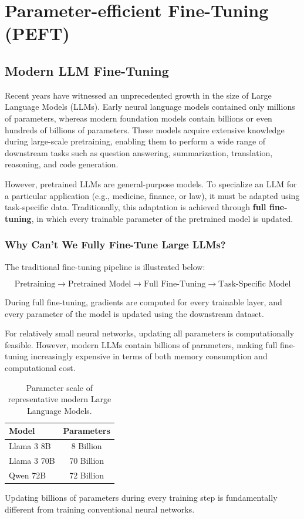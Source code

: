 \chapter{Parameter-efficient Fine-Tuning (PEFT)}





\section{Modern LLM Fine-Tuning}

Recent years have witnessed an unprecedented growth in the size of Large Language Models (LLMs). Early neural language models contained only millions of parameters, whereas modern foundation models contain billions or even hundreds of billions of parameters. These models acquire extensive knowledge during large-scale pretraining, enabling them to perform a wide range of downstream tasks such as question answering, summarization, translation, reasoning, and code generation.

However, pretrained LLMs are general-purpose models. To specialize an LLM for a particular application (e.g., medicine, finance, or law), it must be adapted using task-specific data. Traditionally, this adaptation is achieved through \textbf{full fine-tuning}, in which every trainable parameter of the pretrained model is updated.
\subsection*{Why Can't We Fully Fine-Tune Large LLMs?}

The traditional fine-tuning pipeline is illustrated below:

\[
\text{Pretraining}
\longrightarrow
\text{Pretrained Model}
\longrightarrow
\text{Full Fine-Tuning}
\longrightarrow
\text{Task-Specific Model}
\]

During full fine-tuning, gradients are computed for every trainable layer, and every parameter of the model is updated using the downstream dataset.

For relatively small neural networks, updating all parameters is computationally feasible. However, modern LLMs contain billions of parameters, making full fine-tuning increasingly expensive in terms of both memory consumption and computational cost.
\begin{table}[H]
\centering
\caption{Parameter scale of representative modern Large Language Models.}
\label{tab:llm_parameters}

\renewcommand{\arraystretch}{1.25}

\begin{tabular}{lc}
\toprule
\textbf{Model} & \textbf{Parameters} \\
\midrule
Llama 3 8B  & 8 Billion \\
Llama 3 70B & 70 Billion \\
Qwen 72B    & 72 Billion \\
\bottomrule
\end{tabular}

\end{table}
Updating billions of parameters during every training step is fundamentally different from training conventional neural networks.

